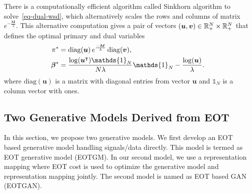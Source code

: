 There is a computationally efficient algorithm called Sinkhorn
algorithm\cite{2013arXiv1306.0895C, 2013arXiv1310.4375C} to
solve~\eqref{eq-dual-wsd}, which alternatively scales the rows and columns of matrix $e^{-\frac{\bm{M}}{\lambda}}$. This alternative computation gives a pair of vectors $(\bm{u}, \bm{v}) \in \mathbb{R}^N_{+} \times \mathbb{R}^N_{+}$ that defines the optimal primary and dual variables \cite[Proposition~2]{2013arXiv1310.4375C} 
\begin{align}\label{eq-dual-opt}
  \pi^{\ast} &=
               \mathrm{diag}(\bm{u}) \, e^{\frac{-\bm{M}}{\la}} \, \mathrm{diag}(\bm{v}),  \nonumber \\
  \bm{\beta}^{\ast} &= \frac{\log(\bm{u}^{\intercal})\mathds{1}_N}{N\la} \mathds{1}_N -\frac{\log(\bm{u})}{\la}.
\end{align}
where $\mathrm{diag}(\bm{u})$ is a matrix with diagonal entries from vector $\bm{u}$ and $\mathds{1}_N$ is a column vector with ones.


\subsection{Two Generative Models Derived from EOT}

In this section, we propose two generative models.
We first develop an EOT based generative model handling signals/data directly. This model is termed as EOT generative model (EOTGM). 
In our second model, we use a
representation mapping where EOT cost is used to optimize the
generative model and representation mapping jointly. The second model is named as EOT based GAN (EOTGAN).

